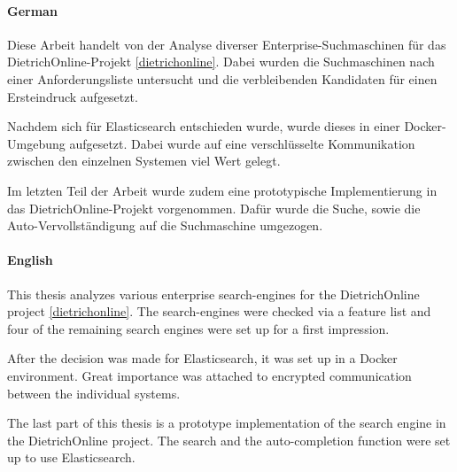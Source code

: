 \kurzfassung

\paragraph*{German}
Diese Arbeit handelt von der Analyse diverser Enterprise-Suchmaschinen für das DietrichOnline-Projekt \ref{dietrichonline}. Dabei wurden die Suchmaschinen nach einer Anforderungsliste untersucht und die verbleibenden Kandidaten für einen Ersteindruck aufgesetzt. 

Nachdem sich für Elasticsearch entschieden wurde, wurde dieses in einer Docker-Umgebung aufgesetzt. Dabei wurde auf eine verschlüsselte Kommunikation zwischen den einzelnen Systemen viel Wert gelegt.

Im letzten Teil der Arbeit wurde zudem eine prototypische Implementierung in das DietrichOnline-Projekt vorgenommen. Dafür wurde die Suche, sowie die Auto-Vervollständigung auf die Suchmaschine umgezogen.

\paragraph*{English}

This thesis analyzes various enterprise search-engines for the DietrichOnline project \ref{dietrichonline}. The search-engines were checked via a feature list and four of the remaining search engines were set up for a first impression.

After the decision was made for Elasticsearch, it was set up in a Docker environment. Great importance was attached to encrypted communication between the individual systems.

The last part of this thesis is a prototype implementation of the search engine in the DietrichOnline project. The search and the auto-completion function were set up to use Elasticsearch.